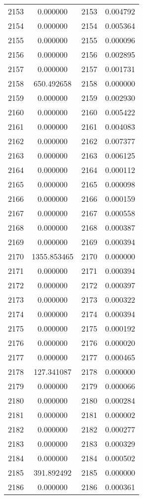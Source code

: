 \documentclass[12pt]{article}
\begin{document}
\begin{longtable}{@{}cccc@{}}
2153 & 0.000000 & 2153 & 0.004792 \\
2154 & 0.000000 & 2154 & 0.005364 \\
2155 & 0.000000 & 2155 & 0.000096 \\
2156 & 0.000000 & 2156 & 0.002895 \\
2157 & 0.000000 & 2157 & 0.001731 \\
2158 & 650.492658 & 2158 & 0.000000 \\
2159 & 0.000000 & 2159 & 0.002930 \\
2160 & 0.000000 & 2160 & 0.005422 \\
2161 & 0.000000 & 2161 & 0.004083 \\
2162 & 0.000000 & 2162 & 0.007377 \\
2163 & 0.000000 & 2163 & 0.006125 \\
2164 & 0.000000 & 2164 & 0.000112 \\
2165 & 0.000000 & 2165 & 0.000098 \\
2166 & 0.000000 & 2166 & 0.000159 \\
2167 & 0.000000 & 2167 & 0.000558 \\
2168 & 0.000000 & 2168 & 0.000387 \\
2169 & 0.000000 & 2169 & 0.000394 \\
2170 & 1355.853465 & 2170 & 0.000000 \\
2171 & 0.000000 & 2171 & 0.000394 \\
2172 & 0.000000 & 2172 & 0.000397 \\
2173 & 0.000000 & 2173 & 0.000322 \\
2174 & 0.000000 & 2174 & 0.000394 \\
2175 & 0.000000 & 2175 & 0.000192 \\
2176 & 0.000000 & 2176 & 0.000020 \\
2177 & 0.000000 & 2177 & 0.000465 \\
2178 & 127.341087 & 2178 & 0.000000 \\
2179 & 0.000000 & 2179 & 0.000066 \\
2180 & 0.000000 & 2180 & 0.000284 \\
2181 & 0.000000 & 2181 & 0.000002 \\
2182 & 0.000000 & 2182 & 0.000277 \\
2183 & 0.000000 & 2183 & 0.000329 \\
2184 & 0.000000 & 2184 & 0.000502 \\
2185 & 391.892492 & 2185 & 0.000000 \\
2186 & 0.000000 & 2186 & 0.000361 \\

\end{longtable}
\end{document}
